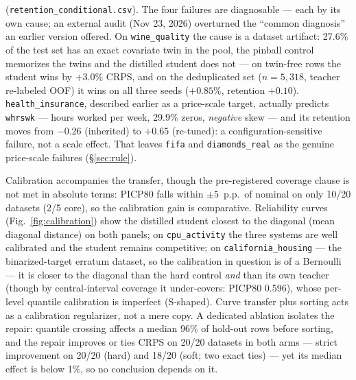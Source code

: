 \documentclass[11pt]{article}
\begin{document}
(\texttt{retention\_\allowbreak conditional.\allowbreak csv}). The four failures are
diagnosable --- each by its own cause; an external audit (Nov 23, 2026)
overturned the ``common diagnosis'' an earlier version offered. On
\texttt{wine\_quality} the cause is a dataset artifact: 27.6\% of the
test set has an exact covariate twin in the pool, the pinball control
memorizes the twins and the distilled student does not --- on twin-free
rows the student wins by $+3.0\%$ CRPS, and on the deduplicated set
($n{=}5{,}318$, teacher re-labeled OOF) it wins on all three seeds
($+0.85\%$, retention $+0.10$). \texttt{health\_insurance}, described
earlier as a price-scale target, actually predicts \texttt{whrswk} ---
hours worked per week, 29.9\% zeros, \emph{negative} skew --- and its
retention moves from $-0.26$ (inherited) to $+0.65$ (re-tuned): a
configuration-sensitive failure, not a scale effect. That leaves
\texttt{fifa} and \texttt{diamonds\_\allowbreak real} as the genuine
price-scale failures (\S\ref{sec:rule}).

Calibration accompanies the transfer, though the pre-registered
coverage clause is not met in absolute terms: PICP80 falls within
$\pm 5$~p.p.\ of nominal on only 10/20 datasets (2/5 core), so the
calibration gain is comparative. Reliability curves
(Fig.~\ref{fig:calibration}) show the distilled student closest to
the
diagonal (mean diagonal distance) on both panels; on
\texttt{cpu\_activity} the three systems are well calibrated and
the student remains competitive; on \texttt{california\_\allowbreak housing} --- the
binarized-target erratum dataset, so the calibration in question is of
a Bernoulli --- it is closer to the diagonal
than the hard control \emph{and} than its own teacher (though by
central-interval coverage it under-covers: PICP80 0.596), whose
per-level quantile calibration is imperfect (S-shaped). Curve transfer plus
sorting acts as a calibration regularizer, not a mere copy. A dedicated
ablation isolates the repair: quantile crossing affects a median 96\% of
hold-out rows before sorting, and the repair improves or ties CRPS on
20/20 datasets in both arms --- strict improvement on 20/20 (hard) and
18/20 (soft; two exact ties) --- yet its median effect is below
1\%, so no conclusion depends on it.
\end{document}
